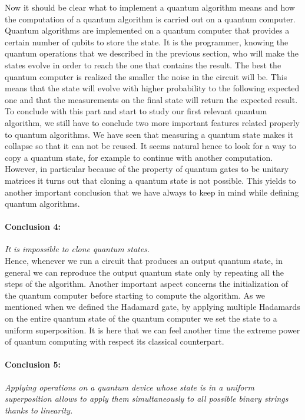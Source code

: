 \documentclass[english]{article}
\begin{document}
			Now it should be clear what to implement a quantum algorithm means and how the computation of a quantum algorithm is carried out on a quantum computer. Quantum algorithms are implemented on a quantum computer that provides a certain number of qubits to store the state. It is the programmer, knowing the quantum operations that we described in the previous section, who will make the states evolve in order to reach the one that contains the result. The best the quantum computer is realized the smaller the noise in the circuit will be. This means that the state will evolve with higher probability to the following expected one and that the measurements on the final state will return the expected result. \\
			
			To conclude with this part and start to study our first relevant quantum algorithm, we still have to conclude two more important features related properly to quantum algorithms. We have seen that measuring a quantum state makes it collapse so that it can not be reused. It seems natural hence to look for a way to copy a quantum state, for example to continue with another computation. However, in particular because of the property of quantum gates to be unitary matrices it turns out that cloning a quantum state is not possible. This yields to another important conclusion that we have always to keep in mind while defining quantum algorithms.
			
			\paragraph{Conclusion 4:} \emph{It is impossible to clone quantum states}.\\
			
			Hence, whenever we run a circuit that produces an output quantum state, in general we can reproduce the output quantum state only by repeating all the steps of the algorithm.
			Another important aspect concerns the initialization of the quantum computer before starting to compute the algorithm. As we mentioned when we defined the Hadamard gate, by applying multiple Hadamards on the entire quantum state of the quantum computer we set the state to a uniform superposition. It is here that we can feel another time the extreme power of quantum computing with respect its classical counterpart.
			
			\paragraph{Conclusion 5:} \emph{Applying operations on a quantum device whose state is in a uniform superposition allows to apply them simultaneously to all possible binary strings thanks to linearity.} 
			
\end{document}
